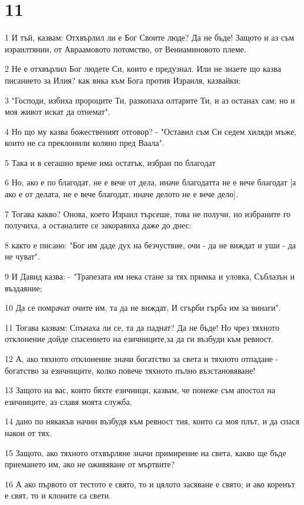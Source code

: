 \chapter{11}

\par 1 И тъй, казвам: Отхвърлил ли е Бог Своите люде? Да не бъде! Защото и аз съм израилтянин, от Авраамовото потомство, от Вениаминовото племе.
\par 2 Не е отхвърлил Бог людете Си, които е предузнал. Или не знаете що казва писанието за Илия? как вика към Бога против Израиля, казвайки:
\par 3 "Господи, избиха пророците Ти, разкопаха олтарите Ти, и аз останах сам; но и моя живот искат да отнемат".
\par 4 Но що му казва божественият отговор? - "Оставил съм Си седем хиляди мъже, които не са преклонили коляно пред Ваала".
\par 5 Така и в сегашно време има остатък, избран по благодат
\par 6 Но, ако е по благодат, не е вече от дела, иначе благодатта не е вече благодат [а ако е от делата, не е вече благодат, иначе делото не е вече дело].
\par 7 Тогава какво? Онова, което Израил търсеше, това не получи, но избраните го получиха, а останалите се закоравиха даже до днес:
\par 8 както е писано: "Бог им даде дух на безчуствие, очи - да не виждат и уши - да не чуват".
\par 9 И Давид казва: - "Трапезата им нека стане за тях примка и уловка, Съблазън и въздаяние;
\par 10 Да се помрачат очите им, та да не виждат, И сгърби гърба им за винаги".
\par 11 Тогава казвам: Спънаха ли се, та да паднат? Да не бъде! Но чрез тяхното отклонение дойде спасението на езичниците,за да ги възбуди към ревност.
\par 12 А, ако тяхното отклонение значи богатство за света и тяхното отпадане - богатство за езичниците, колко повече тяхното пълно възстановяване!
\par 13 Защото на вас, които бяхте езичници, казвам, че понеже съм апостол на езичниците, аз славя моята служба,
\par 14 дано по някакъв начин възбудя към ревност тия, които са моя плът, и да спася накои от тях.
\par 15 Защото, ако тяхното отхвърляне значи примирение на света, какво ще бъде приемането им, ако не оживяване от мъртвите?
\par 16 А ако първото от тестото е свято, то и цялото засяване е свято; и ако коренът е свят, то и клоните са свети.
